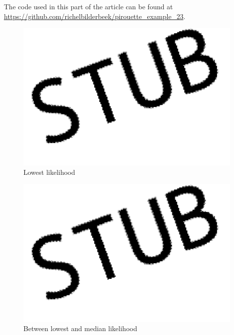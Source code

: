 The code used in this part of the article can be found at 
\url{https://github.com/richelbilderbeek/pirouette_example_23}.

\begin{figure}[H]
  \includegraphics[width=\textwidth]{pirouette_example_23/example_23/314/errors.png}
  \caption{Lowest likelihood}
\end{figure}

\begin{figure}[H]
  \includegraphics[width=\textwidth]{pirouette_example_23/example_23/315/errors.png}
  \caption{Between lowest and median likelihood}
\end{figure}


